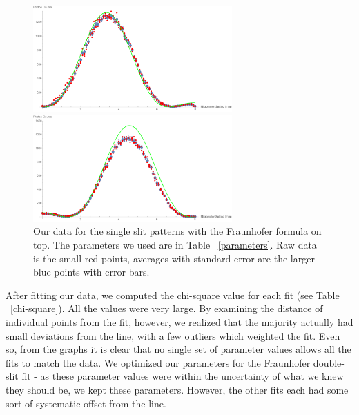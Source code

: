\documentclass[prb,preprint]{revtex4-1}
\begin{document}
\begin{figure}[h!]
\centering
\begin{minipage}[b]{0.45\linewidth}
	\includegraphics[width=3in]{far_slit_Fresnel_plot.pdf}
\end{minipage}
\quad
\begin{minipage}[b]{0.45\linewidth}
	\includegraphics[width=3in]{near_slit_Fresnel_plot.pdf}
\end{minipage}
\caption{Our data for the single slit patterns with the Fraunhofer formula on top. The parameters we used are in Table ~\ref{parameters}. Raw data is the small red points, averages with standard error are the larger blue points with error bars. }
\label{single_slits_Fresnel_plot}
\end{figure}

After fitting our data, we computed the chi-square value for each fit (see Table ~\ref{chi-square}).  All the values were very large.  By examining the distance of individual points from the fit, however, we realized that the majority actually had small deviations from the line, with a few outliers which weighted the fit.  Even so, from the graphs it is clear that no single set of parameter values allows all the fits to match the data.  We optimized our parameters for the Fraunhofer double-slit fit - as these parameter values were within the uncertainty of what we knew they should be, we kept these parameters.  However, the other fits each had some sort of systematic offset from the line.  
\end{document}
